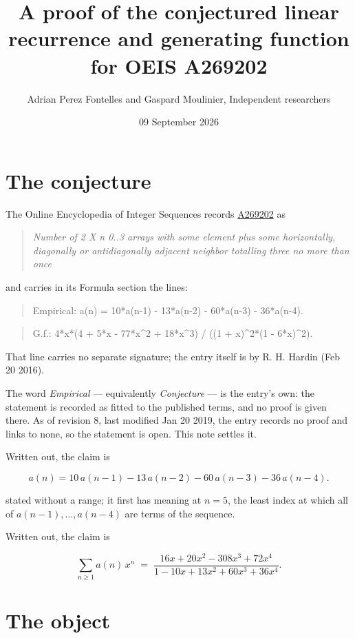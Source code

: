 \documentclass[11pt]{article}
\title{A proof of the conjectured linear recurrence and generating function for OEIS A269202}
\author{Adrian Perez Fontelles and Gaspard Moulinier, Independent researchers}
\date{09 September 2026}
\theoremstyle{definition}
\begin{document}
\maketitle
\section{The conjecture}

The Online Encyclopedia of Integer Sequences records \href{https://oeis.org/A269202}{A269202} as

\begin{quote}\itshape Number of 2 X n 0..3 arrays with some element plus some horizontally, diagonally or antidiagonally adjacent neighbor totalling three no more than once\end{quote}

and carries in its Formula section the lines:

\begin{quote}\ttfamily Empirical: a(n) = 10*a(n-1) - 13*a(n-2) - 60*a(n-3) - 36*a(n-4).\end{quote}

\begin{quote}\ttfamily G.f.: 4*x*(4 + 5*x - 77*x\textasciicircum{}2 + 18*x\textasciicircum{}3) / ((1 + x)\textasciicircum{}2*(1 - 6*x)\textasciicircum{}2).\end{quote}

That line carries no separate signature; the entry itself is by R. H. Hardin (Feb 20 2016).

The word {\itshape Empirical} --- equivalently {\itshape Conjecture} --- is the entry's own: the statement is recorded as fitted to the published terms, and no proof is given there. As of revision 8, last modified Jan 20 2019, the entry records no proof and links to none, so the statement is open. This note settles it.

Written out, the claim is

\[a(n) = 10\,a(n-1) - 13\,a(n-2) - 60\,a(n-3) - 36\,a(n-4).\]

stated without a range; it first has meaning at $n = 5$, the least index at which all of $a(n-1),\dots,a(n-4)$ are terms of the sequence.

Written out, the claim is

\[\sum_{n \ge 1} a(n)\,x^n \;=\; \frac{16x + 20x^{2} - 308x^{3} + 72x^{4}}{1 - 10x + 13x^{2} + 60x^{3} + 36x^{4}}.\]

\section{The object}
\end{document}
